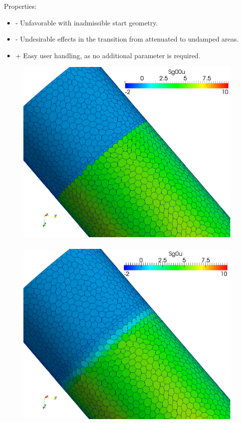 \documentclass[oneside]{article}
\numberwithin{equation}{section}
\numberwithin{figure}{section}
\numberwithin{figure}{section}
\begin{document}
Properties:
\begin{itemize}
    \item - Unfavorable with inadmissible start geometry.
    \item - Undesirable effects in the transition from attenuated to undamped areas.
    \item + Easy user handling, as no additional parameter is required.
\end{itemize}
\begin{figure}[htbp]
    \centering
    \includegraphics[scale=0.085]{Rohr3_damp_0b.png} $ $
    \includegraphics[scale=0.085]{Rohr3_damp_0a.png} $ $

\end{figure}
\end{document}
